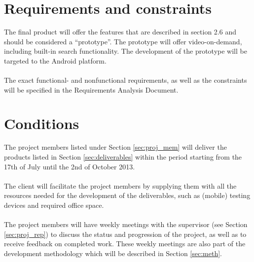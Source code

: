 \section{Requirements and constraints}
The final product will offer the features that are described in section 2.6 and should be considered a ``prototype''. The prototype will offer video-on-demand, including built-in search functionality. The development of the prototype will be targeted to the Android platform. \\
\\
The exact functional- and nonfunctional requirements, as well as the constraints will be specified in the Requirements Analysis Document.
\section{Conditions}
The project members listed under Section \ref{sec:proj_mem} will deliver the products listed in Section \ref{sec:deliverables} within the period starting from the 17th of July until the 2nd of October 2013.\\
\\
The client will facilitate the project members by supplying them with all the resources needed for the development of the deliverables, such as (mobile) testing devices and required office space.\\
\\
The project members will have weekly meetings with the supervisor (see Section \ref{sec:proj_rep}) to discuss the status and progression of the project, as well as to receive feedback on completed work. These weekly meetings are also part of the development methodology which will be described in Section \ref{sec:meth}.
